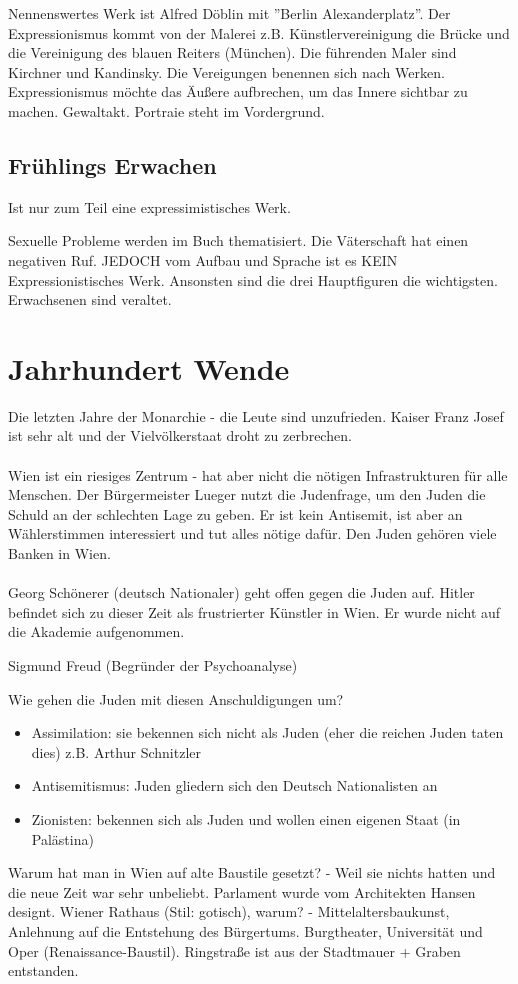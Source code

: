 \documentclass[12pt,a4paper]{article}
\begin{document}
Nennenswertes Werk ist Alfred Döblin mit ''Berlin Alexanderplatz''.
Der Expressionismus kommt von der Malerei z.B. Künstlervereinigung die Brücke und die Vereinigung des blauen Reiters (München). Die führenden Maler sind Kirchner und Kandinsky. Die Vereigungen benennen sich nach Werken. Expressionismus möchte das Äußere aufbrechen, um das Innere sichtbar zu machen. Gewaltakt. Portraie steht im Vordergrund.

\subsection{Frühlings Erwachen}

Ist nur zum Teil eine expressimistisches Werk.

Sexuelle Probleme werden im Buch thematisiert.
Die Väterschaft hat einen negativen Ruf.
JEDOCH vom Aufbau und Sprache ist es KEIN Expressionistisches Werk.
Ansonsten sind die drei Hauptfiguren die wichtigsten. Erwachsenen sind veraltet.

\section{Jahrhundert Wende}

Die letzten Jahre der Monarchie - die Leute sind unzufrieden. Kaiser Franz Josef ist sehr alt und der Vielvölkerstaat droht zu zerbrechen.\\\\
Wien ist ein riesiges Zentrum - hat aber nicht die nötigen Infrastrukturen für alle Menschen. Der Bürgermeister Lueger nutzt die Judenfrage, um den Juden die Schuld an der schlechten Lage zu geben. Er ist kein Antisemit, ist aber an Wählerstimmen interessiert und tut alles nötige dafür. Den Juden gehören viele Banken in Wien.\\\\
Georg Schönerer (deutsch Nationaler) geht offen gegen die Juden auf. Hitler befindet sich zu dieser Zeit als frustrierter Künstler in Wien. Er wurde nicht auf die Akademie aufgenommen.

Sigmund Freud (Begründer der Psychoanalyse)

Wie gehen die Juden mit diesen Anschuldigungen um?

\begin{itemize}
\item Assimilation: sie bekennen sich nicht als Juden (eher die reichen Juden taten dies) z.B. Arthur Schnitzler
\item Antisemitismus: Juden gliedern sich den Deutsch Nationalisten an
\item Zionisten: bekennen sich als Juden und wollen einen eigenen Staat (in Palästina)
\end{itemize}
Warum hat man in Wien auf alte Baustile gesetzt? - Weil sie nichts hatten und die neue Zeit war sehr unbeliebt. Parlament wurde vom Architekten Hansen designt. Wiener Rathaus (Stil: gotisch), warum? - Mittelaltersbaukunst, Anlehnung auf die Entstehung des Bürgertums. Burgtheater, Universität und Oper (Renaissance-Baustil). Ringstraße ist aus der Stadtmauer + Graben entstanden.
\end{document}
